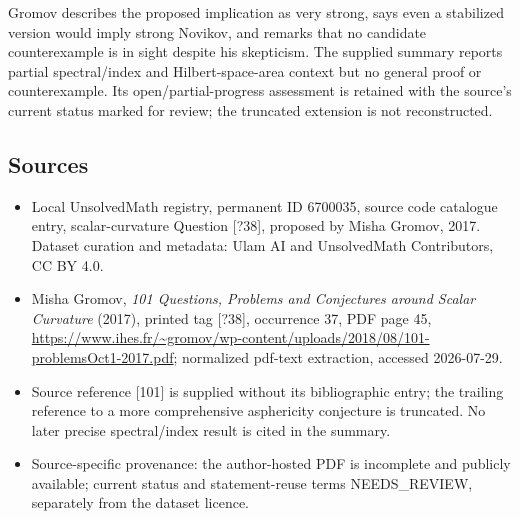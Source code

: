 \documentclass[11pt]{article}
\begin{document}
Gromov describes the proposed implication as very strong, says even a stabilized version would imply strong Novikov, and remarks that no candidate counterexample is in sight despite his skepticism. The supplied summary reports partial spectral/index and Hilbert-space-area context but no general proof or counterexample. Its open/partial-progress assessment is retained with the source's current status marked for review; the truncated extension is not reconstructed.
\subsection{Sources}
\begin{itemize}
\item Local UnsolvedMath registry, permanent ID 6700035, source code catalogue entry, scalar-curvature Question [?38], proposed by Misha Gromov, 2017. Dataset curation and metadata: Ulam AI and UnsolvedMath Contributors, CC BY 4.0.
\item Misha Gromov, \emph{101 Questions, Problems and Conjectures around Scalar Curvature} (2017), printed tag [?38], occurrence 37, PDF page 45, \url{https://www.ihes.fr/~gromov/wp-content/uploads/2018/08/101-problemsOct1-2017.pdf}; normalized pdf-text extraction, accessed 2026-07-29.
\item Source reference [101] is supplied without its bibliographic entry; the trailing reference to a more comprehensive asphericity conjecture is truncated. No later precise spectral/index result is cited in the summary.
\item Source-specific provenance: the author-hosted PDF is incomplete and publicly available; current status and statement-reuse terms NEEDS\_REVIEW, separately from the dataset licence.
\end{itemize}
\end{document}
